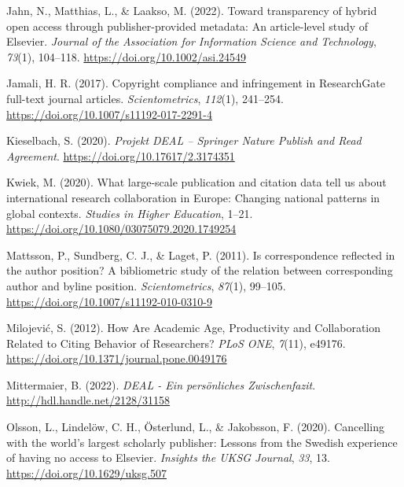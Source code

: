 \documentclass[
]{article}
\newlength{\cslhangindent}
\newlength{\cslentryspacingunit} %
\newenvironment{CSLReferences}[2] %
 {%
  \setlength{\parindent}{0pt}
  \ifodd #1
  \let\oldpar\par
  \def\par{\hangindent=\cslhangindent\oldpar}
  \fi
  \setlength{\parskip}{#2\cslentryspacingunit}
 }%
 {}
\begin{document}
\begin{CSLReferences}{1}{0}
\leavevmode{}%
Jahn, N., Matthias, L., \& Laakso, M. (2022). Toward transparency of hybrid open access through publisher-provided metadata: An article-level study of {Elsevier}. \emph{Journal of the Association for Information Science and Technology}, \emph{73}(1), 104--118. \url{https://doi.org/10.1002/asi.24549}

\leavevmode{}%
Jamali, H. R. (2017). Copyright compliance and infringement in {ResearchGate} full-text journal articles. \emph{Scientometrics}, \emph{112}(1), 241--254. \url{https://doi.org/10.1007/s11192-017-2291-4}

\leavevmode{}%
Kieselbach, S. (2020). \emph{Projekt {DEAL} -- {Springer} {Nature} {Publish} and {Read} {Agreement}}. \url{https://doi.org/10.17617/2.3174351}

\leavevmode{}%
Kwiek, M. (2020). What large-scale publication and citation data tell us about international research collaboration in {Europe}: Changing national patterns in global contexts. \emph{Studies in Higher Education}, 1--21. \url{https://doi.org/10.1080/03075079.2020.1749254}

\leavevmode{}%
Mattsson, P., Sundberg, C. J., \& Laget, P. (2011). Is correspondence reflected in the author position? {A} bibliometric study of the relation between corresponding author and byline position. \emph{Scientometrics}, \emph{87}(1), 99--105. \url{https://doi.org/10.1007/s11192-010-0310-9}

\leavevmode{}%
Milojević, S. (2012). How {Are} {Academic} {Age}, {Productivity} and {Collaboration} {Related} to {Citing} {Behavior} of {Researchers}? \emph{PLoS ONE}, \emph{7}(11), e49176. \url{https://doi.org/10.1371/journal.pone.0049176}

\leavevmode{}%
Mittermaier, B. (2022). \emph{{DEAL} - {E}in persönliches {Z}wischenfazit}. \url{http://hdl.handle.net/2128/31158}

\leavevmode{}%
Olsson, L., Lindelöw, C. H., Österlund, L., \& Jakobsson, F. (2020). Cancelling with the world's largest scholarly publisher: Lessons from the {Swedish} experience of having no access to {Elsevier}. \emph{Insights the UKSG Journal}, \emph{33}, 13. \url{https://doi.org/10.1629/uksg.507}


\end{CSLReferences}
\end{document}

